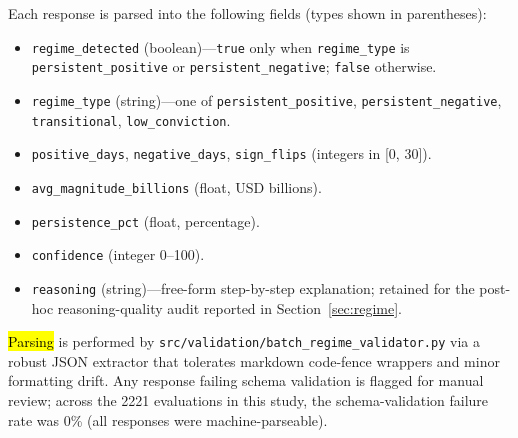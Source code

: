 \documentclass[jrfm,article,accept,moreauthors,pdftex]{Definitions/mdpi}
\begin{document}
Each response is parsed into the following fields (types shown in
parentheses):

\begin{itemize}
    \item \texttt{regime\_detected} (boolean)---\texttt{true} only when
          \texttt{regime\_type} is \texttt{persistent\_positive} or
          \texttt{persistent\_negative}; \texttt{false} otherwise.
    \item \texttt{regime\_type} (string)---one of
          \texttt{persistent\_positive}, \texttt{persistent\_negative},
          \texttt{transitional}, \texttt{low\_conviction}.
    \item \texttt{positive\_days}, \texttt{negative\_days},
          \texttt{sign\_flips} (integers in [0, 30]).
    \item \texttt{avg\_magnitude\_billions} (float, USD billions).
    \item \texttt{persistence\_pct} (float, percentage).
    \item \texttt{confidence} (integer 0--100).
    \item \texttt{reasoning} (string)---free-form step-by-step
          explanation; retained for the post-hoc reasoning-quality audit
          reported in Section~\ref{sec:regime}.
\end{itemize}

\noindent
\hl{Parsing} %
 is performed by \texttt{src/validation/batch\_regime\_validator.py}
via a robust JSON extractor that tolerates markdown code-fence wrappers
and minor formatting drift. Any response failing schema validation is
flagged for manual review; across the 2221 evaluations in this study,
the schema-validation failure rate was 0\% (all responses were
\mbox{machine-parseable).}
\end{document}
